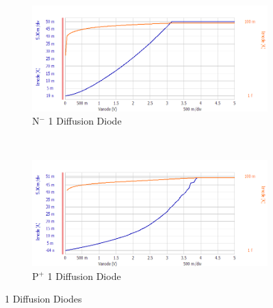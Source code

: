 \documentclass[letter,12pt]{article}
\begin{document}
			\begin{figure}[h!]
				\centering
				\begin{subfigure}[b]{.45\textwidth}
					\includegraphics[width=\textwidth]{./Images/Probe_Test/D_Nwell_1diff.png}
					\caption{N$^-$ 1 Diffusion Diode}
				\end{subfigure}
				~
				\begin{subfigure}[b]{.45\textwidth}
					\includegraphics[width=\textwidth]{./Images/Probe_Test/D_Pwell_1diff.png}
					\caption{P$^+$ 1 Diffusion Diode}
				\end{subfigure}
				\caption{1 Diffusion Diodes}
				\label{fig:D_1diff}
			\end{figure}
		
\end{document}
